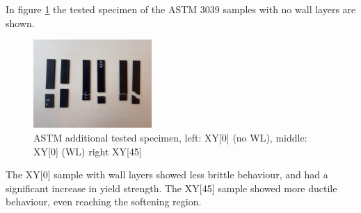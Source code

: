 In figure \ref{fig:ASTM3039addspecimen} the tested specimen of the ASTM 3039 samples with no wall layers are shown.
\begin{figure}[H]
    \centering
    \includegraphics[width=0.40\textwidth]{chapter_5_Experimentaltesting/figures/imageASTMadd.jpg}
    \caption{ASTM additional tested specimen, left: XY[0] (no WL), middle: XY[0] (WL) right XY[45]}
    \label{fig:ASTM3039addspecimen}
\end{figure}
The XY[0] sample with wall layers showed less brittle behaviour, and had a significant increase in yield strength. The XY[45] sample showed  more ductile behaviour, even reaching the softening region.


